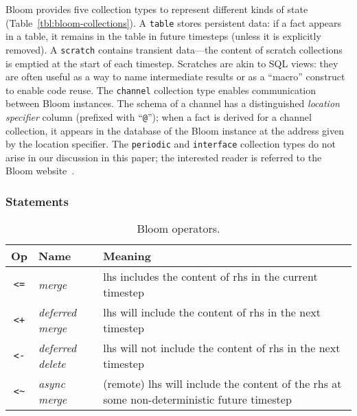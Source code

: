 Bloom provides five collection types to represent different kinds of state
(Table~\ref{tbl:bloom-collections}). A \texttt{table} stores persistent data: if
a fact appears in a table, it remains in the table in future timesteps (unless it
is explicitly removed). A \texttt{scratch} contains transient data---the content
of scratch collections is emptied at the start of each timestep. Scratches are
akin to SQL views: they are often useful as a way to name intermediate results
or as a ``macro'' construct to enable code reuse. The \texttt{channel}
collection type enables communication between Bloom instances. The schema of a
channel has a distinguished \emph{location specifier} column (prefixed with
``\texttt{@}''); when a fact is derived for a channel collection, it appears in
the database of the Bloom instance at the address given by the location
specifier. The \texttt{periodic} and \texttt{interface} collection types do not
arise in our discussion in this paper; the interested reader is referred to the
Bloom website~\cite{bloom}.

\subsubsection{Statements}
\begin{table}
\begin{tabular}{|c|l|p{1.85in}|}
\hline
\textbf{Op} & \textbf{Name} & \textbf{Meaning} \\
\hline
\verb|<=| & \emph{merge} & lhs includes the content of rhs in the
current timestep \\
\hline
\verb|<+| & \emph{deferred merge} & lhs will include the content of rhs in the
next timestep \\
\hline
\verb|<-| & \emph{deferred delete} & lhs will not include the content of rhs
in the next timestep \\
\hline
\verb|<~| & \emph{async merge} & (remote) lhs will include the content of the
rhs at some non-deterministic future timestep\\
\hline
\end{tabular}
\caption{Bloom operators.}
\label{tbl:bloom-ops}
\end{table}

